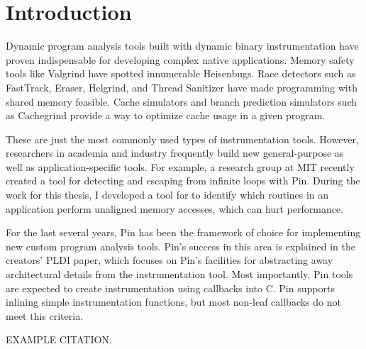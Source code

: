 \chapter{Introduction}

Dynamic program analysis tools built with dynamic binary instrumentation have
proven indispensable for developing complex native applications.  Memory safety
tools like Valgrind\cite{TODO} have spotted innumerable Heisenbugs.  Race
detectors such as FastTrack\cite{TODO}, Eraser\cite{TODO}, Helgrind\cite{TODO},
and Thread Sanitizer\cite{TODO} have made programming with shared memory
feasible.  Cache simulators and branch prediction simulators such as
Cachegrind\cite{TODO} provide a way to optimize cache usage in a given program.

These are just the most commonly used types of instrumentation tools.  However,
researchers in academia and industry frequently build new general-purpose as
well as application-specific tools.  For example, a research group at MIT
recently created a tool for detecting and escaping from infinite loops with
Pin.\cite{TODO}  During the work for this thesis, I developed a tool for
to identify which routines in an application perform unaligned memory accesses,
which can hurt performance.

For the last several years, Pin has been the framework of choice for
implementing new custom program analysis tools.  Pin's success in this area is
explained in the creators' PLDI paper, which focuses on Pin's facilities for
abstracting away architectural details from the instrumentation tool.  Most
importantly, Pin tools are expected to create instrumentation using callbacks
into C.  Pin supports inlining simple instrumentation functions, but most
non-leaf callbacks do not meet this criteria.

EXAMPLE CITATION.  \cite{bruening_phd}
